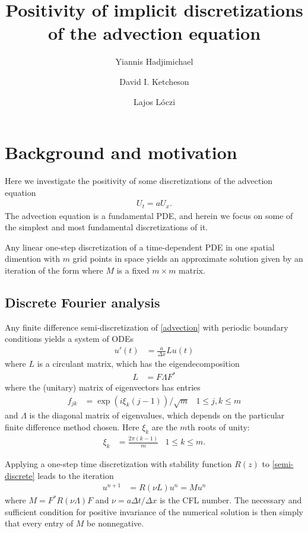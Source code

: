 \documentclass[a4paper]{article}
\title{Positivity of implicit discretizations of the advection equation}
\author{Yiannis Hadjimichael \and David I. Ketcheson \and Lajos L\'oczi}
\newcommand{\dt}{\Delta t}
\newcommand{\dx}{\Delta x}
\begin{document}
\maketitle

\section{Background and motivation}
Here we investigate the positivity of some discretizations of the advection equation
\begin{align} \label{advection}
U_t = a U_x.
\end{align}
The advection equation is a fundamental PDE, and herein we focus on
some of the simplest and most fundamental discretizations of it.

Any linear one-step discretization of a time-dependent PDE in one spatial
dimention with $m$ grid points in space yields an approximate solution given by
an iteration of the form
where $M$ is a fixed $m\times m$ matrix.


\subsection{Discrete Fourier analysis}
Any finite difference semi-discretization of \eqref{advection} with
periodic boundary conditions yields a system of ODEs
\begin{align} \label{semi-discrete}
    u'(t) & = \frac{a}{\dx}Lu(t)
\end{align}
where $L$ is a circulant matrix, which has the eigendecomposition
\begin{align}
    L & = F \Lambda F^*
\end{align}
where the (unitary) matrix of eigenvectors has entries
\begin{align}
    f_{jk} & = \exp(i \xi_k (j-1))/\sqrt{m}  & 1 \le j, k \le m
\end{align}
and $\Lambda$ is the diagonal matrix of eigenvalues, which depends on the
particular finite difference method chosen.  Here $\xi_k$ are the
$m$th roots of unity:
\begin{align}
    \xi_k & = \frac{2\pi(k-1)}{m} & 1 \le k \le m.
\end{align}

Applying a one-step time
discretization with stability function $R(z)$ to \eqref{semi-discrete} leads to
the iteration
\begin{align} \label{M}
    u^{n+1} & = R(\nu L) u^n = Mu^n
\end{align}
where $M=F^* R(\nu \Lambda) F$ and $\nu=a\dt/\dx$ is the CFL number.  The
necessary and sufficient condition for positive invariance of the numerical
solution is then simply that every entry of $M$ be nonnegative.
\end{document}
